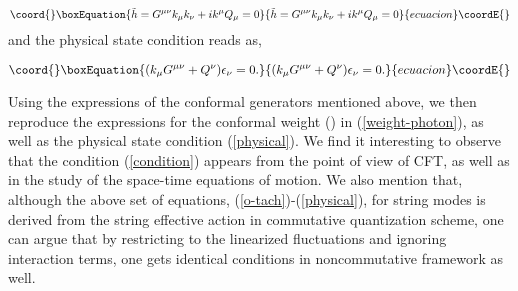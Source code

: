 \documentclass[a4paper,12pt]{article}
\begin{document}
\begin{equation}\coord{}\boxEquation{
 \tilde{h} = G^{\mu \nu} k_{\mu} k_{\nu} + i k^{\mu} Q_{\mu} = 0
\label{weight-photon}
}{
 \tilde{h} = G^{\mu \nu} k_{\mu} k_{\nu} + i k^{\mu} Q_{\mu} = 0
}{ecuacion}\coordE{}\end{equation}
and the physical state condition reads as,

\begin{equation}\coord{}\boxEquation{
(k_{\mu} G^{\mu \nu} + Q^{\nu} ) \epsilon_{\nu} = 0.
\label{physical}
}{
(k_{\mu} G^{\mu \nu} + Q^{\nu} ) \epsilon_{\nu} = 0.
}{ecuacion}\coordE{}\end{equation}

Using the expressions of the conformal generators mentioned above, 
we then reproduce the expressions for the 
conformal weight (\coordHE{}) in (\ref{weight-photon}), 
as well as the physical 
state condition (\ref{physical}). We find it interesting to 
observe that the condition (\ref{condition}) appears from 
the point of 
view of CFT, as well as in the study of the space-time equations of
motion. We also mention that, although the above set of 
equations, (\ref{o-tach})-(\ref{physical}), 
for string modes is derived from the string effective action 
in commutative quantization scheme, one can argue that by 
restricting to the
linearized fluctuations and ignoring interaction terms, one gets 
identical conditions in noncommutative framework as well. 
\end{document}
